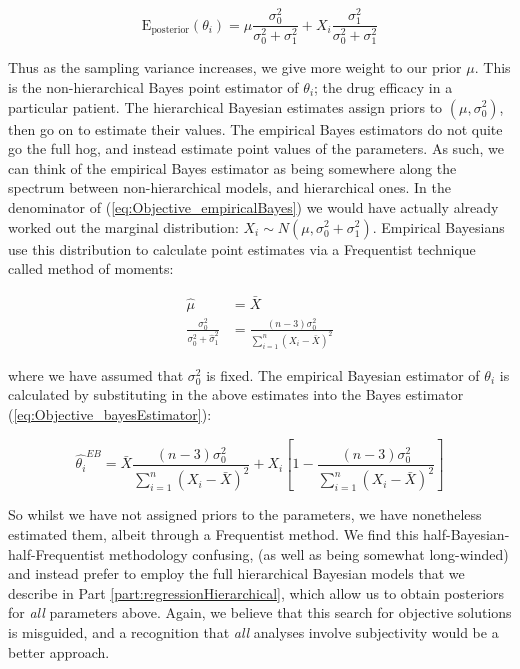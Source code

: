 \documentclass[11pt,fullpage]{book}
\begin{document}
\begin{equation}\label{eq:Objective_bayesEstimator}
\mathrm{E_{posterior}}(\theta_i) = \mu\frac{\sigma_0^2}{\sigma_0^2+\sigma_1^2} + X_i\frac{\sigma_1^2}{\sigma_0^2+\sigma_1^2}
\end{equation}

Thus as the sampling variance increases, we give more weight to our prior $\mu$. This is the non-hierarchical Bayes point estimator of $\theta_i$; the drug efficacy in a particular patient. The hierarchical Bayesian estimates assign priors to $(\mu,\sigma_0^2)$, then go on to estimate their values. The empirical Bayes estimators do not quite go the full hog, and instead estimate point values of the parameters. As such, we can think of the empirical Bayes estimator as being somewhere along the spectrum between non-hierarchical models, and hierarchical ones. In the denominator of (\ref{eq:Objective_empiricalBayes}) we would have actually already worked out the marginal distribution: $X_i\sim N(\mu,\sigma_0^2+\sigma_1^2)$. Empirical Bayesians use this distribution to calculate point estimates via a Frequentist technique called method of moments\cite{casella1985introduction}: 

\begin{align}
\hat{\mu} &= \bar{X}\\
\frac{\sigma_0^2}{\sigma_0^2+\hat{\sigma}_1^2} &= \frac{(n-3)\sigma_0^2}{\sum\limits_{i=1}^{n}(X_i-\bar{X})^2}
\end{align}

where we have assumed that $\sigma_0^2$ is fixed. The empirical Bayesian estimator of $\theta_i$ is calculated by substituting in the above estimates into the Bayes estimator (\ref{eq:Objective_bayesEstimator}):

\begin{equation}
\hat{\theta_i}^{EB} = \bar{X}\frac{(n-3)\sigma_0^2}{\sum\limits_{i=1}^{n}(X_i-\bar{X})^2} + X_i \left[1-\frac{(n-3)\sigma_0^2}{\sum\limits_{i=1}^{n}(X_i-\bar{X})^2}\right]
\end{equation}

So whilst we have not assigned priors to the parameters, we have nonetheless estimated them, albeit through a Frequentist method. We find this half-Bayesian-half-Frequentist methodology confusing, (as well as being somewhat long-winded) and instead prefer to employ the full hierarchical Bayesian models that we describe in Part \ref{part:regressionHierarchical}, which allow us to obtain posteriors for \textit{all} parameters above. Again, we believe that this search for objective solutions is misguided, and a recognition that \textit{all} analyses involve subjectivity would be a better approach. 
\end{document}
